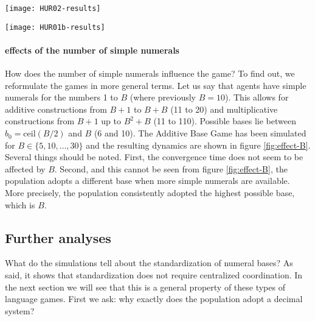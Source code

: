 \documentclass{../src/bcthesispart}
\begin{document}
\begin{SCfigure}
	\texttt{[image: HUR02-results]}	
	\caption{Effects of $\eta$, the parameter that determines which bases are favoured, in the \textsc{abg}. 
		Dynamics are visualized using
		 the total base count and
		 the unique base count.
		$\eta$ strongly influenes the convergence time.
		\\[1em]
		Results shown for $N=200$, $B=10$; avg.\ of 300 runs; 1 std.\ shaded.
		\label{fig:effects-eta}}
\end{SCfigure}

\begin{SCfigure}
	\texttt{[image: HUR01b-results]}	
	\caption{The effect of $B$, the number of simple numerals, in the \textsc{abg}. One effect is \emph{not} shown: the population always adopte $B$ as a base (see main text for details).
		\\[1em]
		Results shown for $N=200$, $\eta=1$; avg.\ of 300 runs; 1 std.\ shaded.
		\label{fig:effect-B}}
\end{SCfigure}

\paragraph{effects of the number of simple numerals}
How does the number of simple numerals influence the game?
To find out, we reformulate the games in more general terms.
Let us say that agents have simple numerals for the numbers 1 to $B$ (where previously $B=10$). 
This allows for additive constructions from $B+1$ to $B+B$ (11 to 20) and multiplicative constructions from $B+1$ up to $B^2+B$ (11 to 110). 
Possible bases lie between $b_0=\text{ceil}(B/2)$ and $B$ (6 and 10).
The Additive Base Game has been simulated for $B\in \{5, 10, \dots, 30\}$ and the resulting dynamics are shown in figure \ref{fig:effect-B}. 
Several things should be noted. First, the convergence time does not seem to be affected by $B$.
Second, and this cannot be seen from figure \ref{fig:effect-B}, the population adopts a different base when more simple numerals are available. 
More precisely, the population consistently adopted the highest possible base, which is $B$.




\subsection{Further analyses}
What do the simulations tell about the standardization of numeral bases?
As said, it shows that standardization does not require centralized coordination.
In the next section we will see that this is a general property of these types of language games.
First we ask: why exactly does the population adopt a decimal system?
\end{document}

